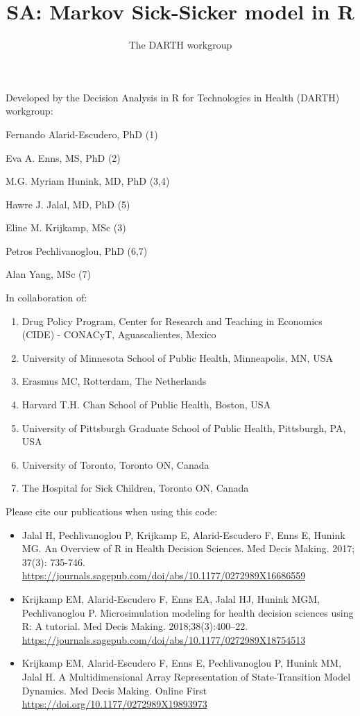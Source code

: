 \documentclass[]{article}
\title{SA: Markov Sick-Sicker model in R}
\author{The DARTH workgroup}
\date{}
\providecommand{\tightlist}{%
  \setlength{\itemsep}{0pt}\setlength{\parskip}{0pt}}
\begin{document}
\maketitle

Developed by the Decision Analysis in R for Technologies in Health
(DARTH) workgroup:

Fernando Alarid-Escudero, PhD (1)

Eva A. Enns, MS, PhD (2)

M.G. Myriam Hunink, MD, PhD (3,4)

Hawre J. Jalal, MD, PhD (5)

Eline M. Krijkamp, MSc (3)

Petros Pechlivanoglou, PhD (6,7)

Alan Yang, MSc (7)

In collaboration of:

\begin{enumerate}
\def\labelenumi{\arabic{enumi}.}
\tightlist
\item
  Drug Policy Program, Center for Research and Teaching in Economics
  (CIDE) - CONACyT, Aguascalientes, Mexico
\item
  University of Minnesota School of Public Health, Minneapolis, MN, USA
\item
  Erasmus MC, Rotterdam, The Netherlands
\item
  Harvard T.H. Chan School of Public Health, Boston, USA
\item
  University of Pittsburgh Graduate School of Public Health, Pittsburgh,
  PA, USA
\item
  University of Toronto, Toronto ON, Canada
\item
  The Hospital for Sick Children, Toronto ON, Canada
\end{enumerate}

Please cite our publications when using this code:

\begin{itemize}
\item
  Jalal H, Pechlivanoglou P, Krijkamp E, Alarid-Escudero F, Enns E,
  Hunink MG. An Overview of R in Health Decision Sciences. Med Decis
  Making. 2017; 37(3): 735-746.
  \url{https://journals.sagepub.com/doi/abs/10.1177/0272989X16686559}
\item
  Krijkamp EM, Alarid-Escudero F, Enns EA, Jalal HJ, Hunink MGM,
  Pechlivanoglou P. Microsimulation modeling for health decision
  sciences using R: A tutorial. Med Decis Making. 2018;38(3):400--22.
  \url{https://journals.sagepub.com/doi/abs/10.1177/0272989X18754513}
\item
  Krijkamp EM, Alarid-Escudero F, Enns E, Pechlivanoglou P, Hunink MM,
  Jalal H. A Multidimensional Array Representation of State-Transition
  Model Dynamics. Med Decis Making. Online First
  \url{https://doi.org/10.1177/0272989X19893973}
\end{itemize}
\end{document}
